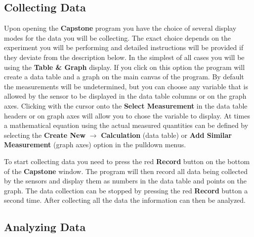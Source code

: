 \subsection{Collecting Data}

Upon opening the \textbf{Capstone} program you have the choice of several display modes for the data you will be collecting. The exact choice depends on the experiment you will be performing and detailed instructions will be provided if they deviate from the description below. In the simplest of all cases you will be using the \textbf{Table \& Graph} display. If you click on this option the program will create a data table and a graph on the main canvas of the program. By default the measurements will be undetermined, but you can choose any variable that is allowed by the sensor to be displayed in the data table columns or on the graph axes. Clicking with the cursor onto the \textbf{Select Measurement} in the data table headers or on graph axes will allow you to chose the variable to display. At times a mathematical equation using the actual measured quantities can be defined by selecting the \textbf{Create New} \(\rightarrow\) \textbf{Calculation} (data table) or \textbf{Add Similar Measurement} (graph axes) option in the pulldown menus.

To start collecting data you need to press the red \textbf{Record} button on the bottom of the \textbf{Capstone} window. The program will then record all data being collected by the sensors and display them as numbers in the data table and points on the graph. The data collection can be stopped by pressing the red \textbf{Record} button a second time. After collecting all the data the information can then be analyzed.

\subsection{Analyzing Data}

